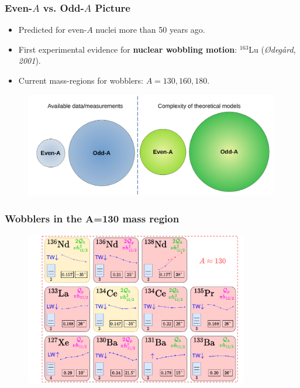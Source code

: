 \documentclass{beamer}
\begin{document}
\begin{frame}
	\frametitle{Even-$A$ vs. Odd-$A$ Picture}
	\begin{itemize}
		\item Predicted for even-$A$ nuclei more than 50 years ago.
		\item First experimental evidence for \textbf{nuclear wobbling motion}: $^{163}$Lu (\textit{Ødegård, 2001}).
		\item Current mass-regions for wobblers: $A=130,160,180$.
	\end{itemize}
	\begin{figure}
		\centering
		\includegraphics[width=0.99\textwidth]{figures/even-vs-odda.pdf}
	\end{figure}
\end{frame}

\begin{frame}
	\frametitle{Wobblers in the A=130 mass region}
	\begin{figure}
		\centering
		\includegraphics[width=0.87\textwidth]{figures/wobblers-chart-2.pdf}
	\end{figure}
\end{frame}
\end{document}
